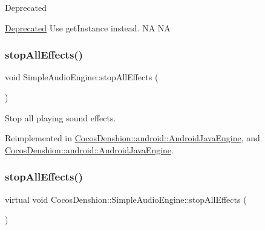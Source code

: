 \begin{DoxyRefDesc}{Deprecated}
\item[\hyperlink{deprecated__deprecated000282}{Deprecated}]Use {\ttfamily get\+Instance} instead.  NA  NA \end{DoxyRefDesc}
\mbox{\label{classCocosDenshion_1_1SimpleAudioEngine_a41cac6b6201c29a06ce18e52191520de}} 
\subsubsection{\texorpdfstring{stop\+All\+Effects()}{stopAllEffects()}\hspace{0.1cm}{\footnotesize\ttfamily [1/2]}}
{\footnotesize\ttfamily void Simple\+Audio\+Engine\+::stop\+All\+Effects (\begin{DoxyParamCaption}{ }\end{DoxyParamCaption})\hspace{0.3cm}{\ttfamily [virtual]}}

Stop all playing sound effects. 

Reimplemented in \hyperlink{classCocosDenshion_1_1android_1_1AndroidJavaEngine_a799f2f5d4f50aacfd975e5983f46bbed}{Cocos\+Denshion\+::android\+::\+Android\+Java\+Engine}, and \hyperlink{classCocosDenshion_1_1android_1_1AndroidJavaEngine_a38d6736750cc2832b9a5dea632f293b6}{Cocos\+Denshion\+::android\+::\+Android\+Java\+Engine}.

\mbox{\label{classCocosDenshion_1_1SimpleAudioEngine_a59d96cc7856375142ac44f5b729eadb3}} 
\subsubsection{\texorpdfstring{stop\+All\+Effects()}{stopAllEffects()}\hspace{0.1cm}{\footnotesize\ttfamily [2/2]}}
{\footnotesize\ttfamily virtual void Cocos\+Denshion\+::\+Simple\+Audio\+Engine\+::stop\+All\+Effects (\begin{DoxyParamCaption}{ }\end{DoxyParamCaption})\hspace{0.3cm}{\ttfamily [virtual]}}

